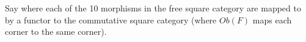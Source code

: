 
Say where each of the 10 morphisms in the free square category are mapped to by a functor to the commutative square category (where $Ob(F)$ maps each corner to the same corner).